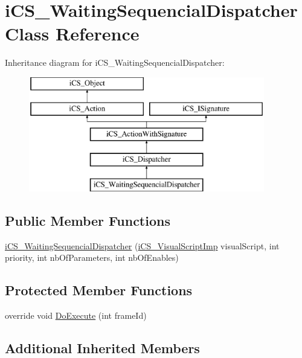 \hypertarget{classi_c_s___waiting_sequencial_dispatcher}{\section{i\+C\+S\+\_\+\+Waiting\+Sequencial\+Dispatcher Class Reference}
\label{classi_c_s___waiting_sequencial_dispatcher}
}
Inheritance diagram for i\+C\+S\+\_\+\+Waiting\+Sequencial\+Dispatcher\+:\begin{figure}[H]
\begin{center}
\leavevmode
\includegraphics[height=5.000000cm]{classi_c_s___waiting_sequencial_dispatcher}
\end{center}
\end{figure}
\subsection*{Public Member Functions}
\begin{DoxyCompactItemize}
\item 
\hyperlink{classi_c_s___waiting_sequencial_dispatcher_a561ea3ea072182c800540ffb432626c3}{i\+C\+S\+\_\+\+Waiting\+Sequencial\+Dispatcher} (\hyperlink{classi_c_s___visual_script_imp}{i\+C\+S\+\_\+\+Visual\+Script\+Imp} visual\+Script, int priority, int nb\+Of\+Parameters, int nb\+Of\+Enables)
\end{DoxyCompactItemize}
\subsection*{Protected Member Functions}
\begin{DoxyCompactItemize}
\item 
override void \hyperlink{classi_c_s___waiting_sequencial_dispatcher_a81743c6e8dff2869f35576e59baa37dc}{Do\+Execute} (int frame\+Id)
\end{DoxyCompactItemize}
\subsection*{Additional Inherited Members}


